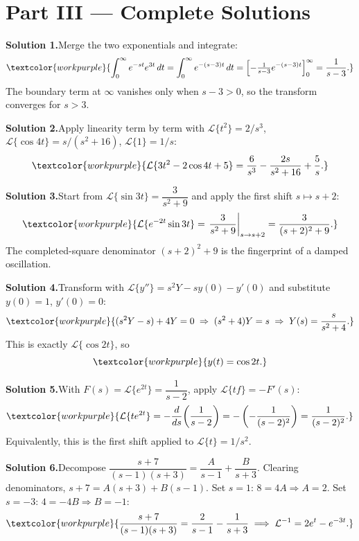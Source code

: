 \clearpage
{}
{}
\section*{Part III --- Complete Solutions}

\noindent\textbf{Solution 1.}\quad Merge the two exponentials and integrate:
\[ \textcolor{workpurple}{\int_0^\infty e^{-st}e^{3t}\,dt = \int_0^\infty e^{-(s-3)t}\,dt
   = \left[-\tfrac{1}{s-3}e^{-(s-3)t}\right]_0^\infty = \frac{1}{s-3}.} \]
The boundary term at $\infty$ vanishes only when $s-3>0$, so the transform converges
for $s>3$.

\medskip
\noindent\textbf{Solution 2.}\quad Apply linearity term by term with
$\mathcal{L}\{t^2\}=2/s^3$, $\mathcal{L}\{\cos 4t\}=s/(s^2+16)$, $\mathcal{L}\{1\}=1/s$:
\[ \textcolor{workpurple}{\mathcal{L}\{3t^2 - 2\cos 4t + 5\}
   = \frac{6}{s^3} - \frac{2s}{s^2+16} + \frac{5}{s}.} \]

\medskip
\noindent\textbf{Solution 3.}\quad Start from $\mathcal{L}\{\sin 3t\}=\dfrac{3}{s^2+9}$
and apply the first shift $s\mapsto s+2$:
\[ \textcolor{workpurple}{\mathcal{L}\{e^{-2t}\sin 3t\}
   = \left.\frac{3}{s^2+9}\right|_{s\to s+2} = \frac{3}{(s+2)^2+9}.} \]
The completed-square denominator $(s+2)^2+9$ is the fingerprint of a damped oscillation.

\medskip
\noindent\textbf{Solution 4.}\quad Transform with $\mathcal{L}\{y''\}=s^2Y-sy(0)-y'(0)$
and substitute $y(0)=1$, $y'(0)=0$:
\[ \textcolor{workpurple}{(s^2 Y - s) + 4Y = 0 \;\Rightarrow\; (s^2+4)Y = s
   \;\Rightarrow\; Y(s) = \frac{s}{s^2+4}.} \]
This is exactly $\mathcal{L}\{\cos 2t\}$, so
\[ \textcolor{workpurple}{y(t) = \cos 2t.} \]

\medskip
\noindent\textbf{Solution 5.}\quad With $F(s)=\mathcal{L}\{e^{2t}\}=\dfrac{1}{s-2}$,
apply $\mathcal{L}\{tf\}=-F'(s)$:
\[ \textcolor{workpurple}{\mathcal{L}\{t e^{2t}\} = -\frac{d}{ds}\!\left(\frac{1}{s-2}\right)
   = -\left(-\frac{1}{(s-2)^2}\right) = \frac{1}{(s-2)^2}.} \]
Equivalently, this is the first shift applied to $\mathcal{L}\{t\}=1/s^2$.

\medskip
\noindent\textbf{Solution 6.}\quad Decompose
$\dfrac{s+7}{(s-1)(s+3)} = \dfrac{A}{s-1} + \dfrac{B}{s+3}$. Clearing denominators,
$s+7 = A(s+3) + B(s-1)$. Set $s=1$: $8=4A\Rightarrow A=2$. Set $s=-3$:
$4=-4B\Rightarrow B=-1$:
\[ \textcolor{workpurple}{\frac{s+7}{(s-1)(s+3)} = \frac{2}{s-1} - \frac{1}{s+3}
   \;\Longrightarrow\; \mathcal{L}^{-1} = 2e^{t} - e^{-3t}.} \]

